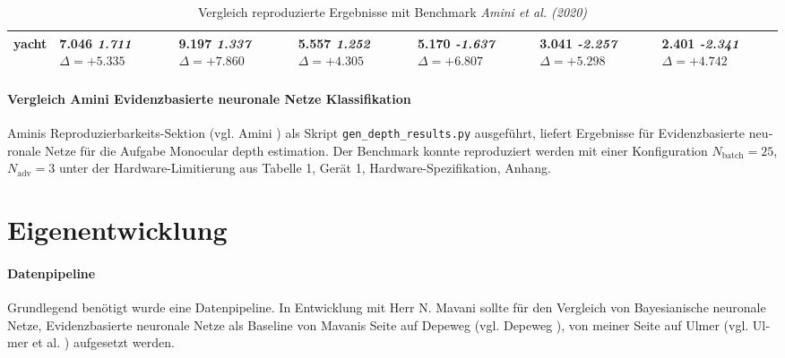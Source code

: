 \begin{otherlanguage}{ngerman}
\begin{table*}[!htbp]
\begin{tabularx}{\textwidth}{|l|X|X|X|X|X|X|}
yacht 
& 7.046 \newline \textit{1.711} \newline \mbox{$\Delta=+5.335$} 
& 9.197 \newline \textit{1.337} \newline \mbox{$\Delta=+7.860$} 
& 5.557 \newline \textit{1.252} \newline \mbox{$\Delta=+4.305$} 
& 5.170 \newline \textit{-1.637} \newline \mbox{$\Delta=+6.807$} 
& 3.041 \newline \textit{-2.257} \newline \mbox{$\Delta=+5.298$} 
& 2.401 \newline \textit{-2.341} \newline \mbox{$\Delta=+4.742$} \\ \hline
\end{tabularx}
\caption{Vergleich reproduzierte Ergebnisse mit Benchmark \textit{Amini et al. (2020)}}
\label{tab:comparison_ours_vs_amini_tabularx_v3}
\end{table*}


\paragraph{Vergleich Amini \gls{Evidenzbasierte neuronale Netze} Klassifikation} Aminis Reproduzierbarkeits-Sektion (vgl. Amini \parencite{amini2020deep}) als Skript \texttt{gen\_depth\_results.py} ausgeführt, liefert Ergebnisse für \gls{Evidenzbasierte neuronale Netze} für die Aufgabe \glqq Monocular depth estimation\grqq. Der Benchmark konnte reproduziert werden mit einer Konfiguration $N_\text{batch}=25$, $N_\text{adv}=3$ unter der Hardware-Limitierung aus Tabelle 1, Gerät 1, Hardware-Spezifikation, Anhang. %



\section*{Eigenentwicklung}

\paragraph{Datenpipeline} Grundlegend benötigt wurde eine Datenpipeline. In Entwicklung mit Herr N. Mavani sollte für den Vergleich von \gls{Bayesianische neuronale Netze}, \gls{Evidenzbasierte neuronale Netze} als Baseline von Mavanis Seite auf Depeweg (vgl. Depeweg \parencite{Depeweg2019}), von meiner Seite auf Ulmer (vgl. Ulmer et al. \parencite{Ulmer2023}) aufgesetzt werden.


\end{otherlanguage}
